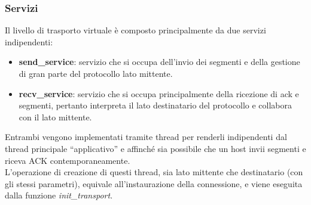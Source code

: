 \subsubsection{Servizi}
Il livello di trasporto virtuale è composto principalmente da due servizi 
indipendenti:
%
\begin{itemize}
\item \textbf{send\_service}: servizio che si occupa dell'invio dei segmenti e
della gestione di gran parte del protocollo lato mittente.
\item \textbf{recv\_service}: servizio che si occupa principalmente della
ricezione di ack e segmenti, pertanto interpreta il lato destinatario del 
protocollo e collabora con il lato mittente.
\end{itemize}
%
Entrambi vengono implementati tramite thread per renderli indipendenti dal 
thread principale ``applicativo'' e affinché sia possibile che un host invii 
segmenti e riceva ACK contemporaneamente.\\
L'operazione di creazione di questi thread, sia lato mittente che destinatario
(con gli stessi parametri), equivale all'instaurazione della connessione,
e viene eseguita dalla funzione \emph{init\_transport}.
%
